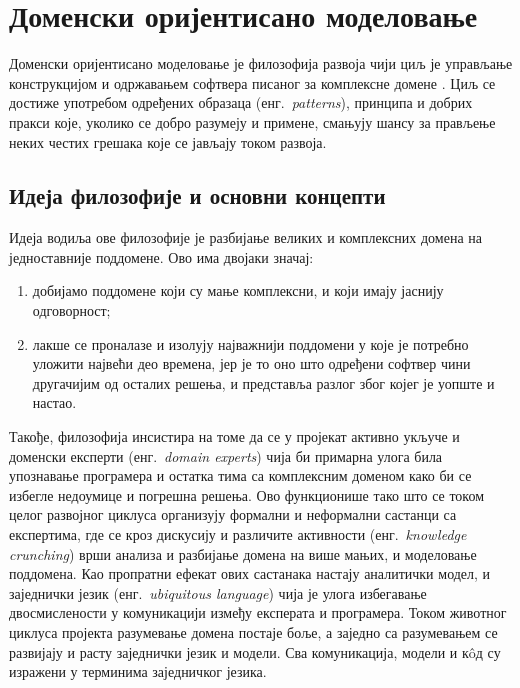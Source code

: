 \documentclass[12pt,oneside]{memoir}
\begin{document}
\chapter{Доменски оријентисано моделовање}\label{domenskiorijentisanomodelovanje}
Доменски оријентисано моделовање је филозофија развоја чији циљ је управљање конструкцијом и одржавањем софтвера писаног за комплексне домене \cite{DomainDrivenDessign}. Циљ се достиже употребом одређених образаца (енг.~\textit{patterns}), принципа и добрих пракси које, уколико се добро разумеју и примене, смањују шансу за прављење неких честих грешака које се јављају током развоја.

\section{Идеја филозофије и основни концепти}
Идеја водиља ове филозофије је разбијање великих и комплексних домена на једноставније поддомене. Ово има двојаки значај:
\begin{enumerate}
\item добијамо поддомене који су мање комплексни, и који имају јаснију одговорност;
\item лакше се проналазе и изолују најважнији поддомени у које је потребно уложити највећи део времена, јер је то оно што одређени софтвер чини другачијим од осталих решења, и представља разлог због којег је уопште и настао.
\end{enumerate}

Такође, филозофија инсистира на томе да се у пројекат активно укључе и доменски експерти (енг.~\textit{domain experts}) чија би примарна улога била упознавање програмера и остатка тима са комплексним доменом како би се избегле недоумице и погрешна решења. Ово функционише тако што се током целог развојног циклуса организују формални и неформални састанци са експертима, где се кроз дискусију и различите активности (енг.~\textit{knowledge crunching}) врши анализа и разбијање домена на више мањих, и моделовање поддомена. Као пропратни ефекат ових састанака настају аналитички модел, и заједнички језик (енг.~\textit{ubiquitous language}) чија је улога избегавање двосмислености у комуникацији између експерата и програмера. Током животног циклуса пројекта разумевање домена постаје боље, а заједно са разумевањем се развијају и расту заједнички језик и модели. Сва комуникација, модели и кôд су изражени у терминима заједничког језика.
\end{document}
